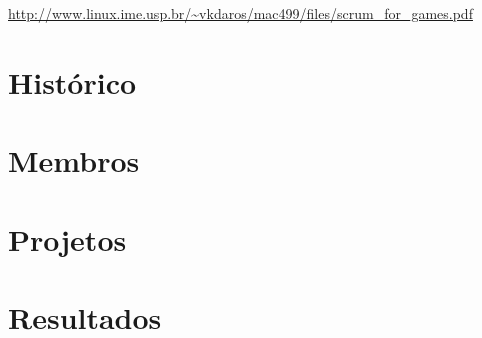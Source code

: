 \documentclass[12pt,onecolumn,a4paper]{article}
\begin{document}
        \begin{center}
            \footnotesize
            \url{http://www.linux.ime.usp.br/~vkdaros/mac499/files/scrum_for_games.pdf}
        \end{center}

\section{\LARGE Histórico}

\section{\LARGE Membros}

\section{\LARGE Projetos}


\section{\LARGE Resultados}

\end{document}
